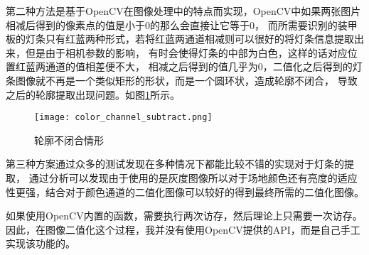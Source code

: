 第二种方法是基于OpenCV在图像处理中的特点而实现，OpenCV中如果两张图片相减后得到的像素点的值是小于0的那么会直接让它等于0，
而所需要识别的装甲板的灯条只有红蓝两种形式，若将红蓝两通道相减则可以很好的将灯条信息提取出来，但是由于相机参数的影响，
有时会使得灯条的中部为白色，这样的话对应位置红蓝两通道的值相差便不大，
相减之后得到的值几乎为0，二值化之后得到的灯条图像就不再是一个类似矩形的形状，而是一个圆环状，造成轮廓不闭合，
导致之后的轮廓提取出现问题。如图\ref{轮廓不闭合情形}所示。\par
\begin{figure}[H]
    \centering
    \texttt{[image: color\_channel\_subtract.png]} 
    \caption{轮廓不闭合情形} 
    \label{轮廓不闭合情形}
\end{figure}


第三种方案通过众多的测试发现在多种情况下都能比较不错的实现对于灯条的提取，
通过分析可以发现由于使用的是灰度图像所以对于场地颜色还有亮度的适应性更强，结合对于颜色通道的二值化图像可以较好的得到最终所需的二值化图像。\par

如果使用OpenCV内置的函数，需要执行两次访存，然后理论上只需要一次访存。因此，在图像二值化这个过程，我并没有使用OpenCV提供的API，而是自己手工实现该功能的。

